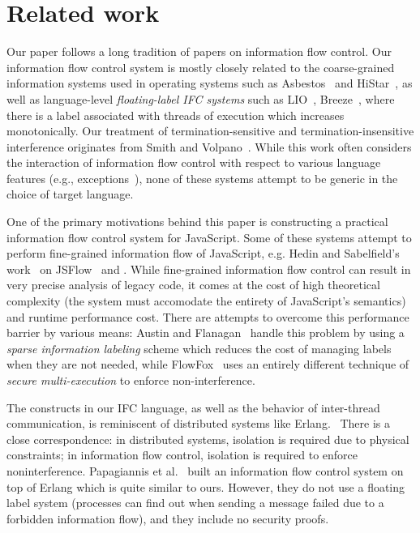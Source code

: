 \section{Related work}
\label{sec:related}

Our paper follows a long tradition of papers on information flow
control.  Our information flow control system is mostly closely related
to the coarse-grained information systems used in operating systems such
as Asbestos~\cite{efstathopoulos:asbestos} and
HiStar~\cite{Zeldovich:2006}, as well as language-level
\emph{floating-label IFC systems} such as LIO~\cite{lio},
Breeze~\cite{Hritcu:2013:YIB:2497621.2498098}, where there is a label
associated with threads of execution which increases monotonically.
Our treatment of termination-sensitive and termination-insensitive interference
originates from Smith and Volpano~\cite{Smith:Volpano:MultiThreaded,Volpano:1997:ECF:794197.795081}.
While this work often considers the interaction of information flow
control with respect to various language features (e.g.,
exceptions~\cite{Hritcu:2013:YIB:2497621.2498098}), none of these
systems attempt to be generic in the choice of target language.

One of the primary motivations behind this paper is constructing a
practical information flow control system for JavaScript.  Some of
these systems attempt to perform fine-grained information flow of
JavaScript, e.g. Hedin and Sabelfield's work~\cite{Hedin:2012} on JSFlow~\cite{JSFlow}
and .  While fine-grained information flow
control can result in very precise analysis of legacy code, it comes
at the cost of high theoretical complexity (the system must accomodate
the entirety of JavaScript's semantics) and runtime performance cost.
There are attempts to overcome this performance barrier by various means:
Austin and Flanagan~\cite{Austin:Flanagan:PLAS09} handle this problem
by using a \emph{sparse information labeling} scheme which reduces the
cost of managing labels when they are not needed, while FlowFox~\cite{DeGroef:2012}
uses an entirely different technique of \emph{secure multi-execution} to
enforce non-interference. 

The constructs in our IFC language, as well as the behavior of
inter-thread communication, is reminiscent of distributed systems
like Erlang.~\cite{Armstrong03makingreliable}  There is a close
correspondence: in distributed systems, isolation is required due to
physical constraints; in information flow control, isolation is
required to enforce noninterference.  Papagiannis et al.~\cite{Papagiannis_enforcinguser}
built an information flow control system on top of Erlang which is quite
similar to ours.  However, they do not use a floating label system (processes
can find out when sending a message failed due to a forbidden information flow),
and they include no security proofs.

